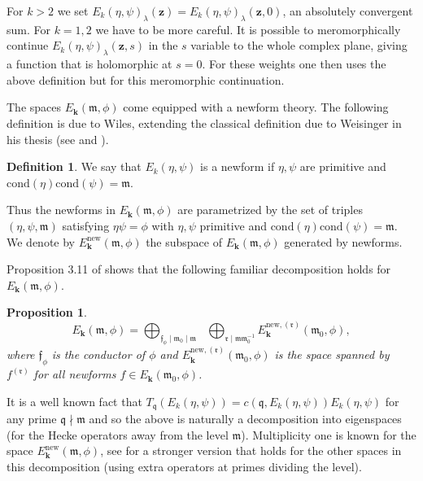 \documentclass[a4paper,oneside]{amsart}
\theoremstyle{plain}
\newtheorem{prop}[thm]{Proposition}
\theoremstyle{definition}
\newtheorem{define}[thm]{Definition}
\begin{document}
For $k>2$ we set $E_k(\eta,\psi)_{\lambda}(\textbf{z}) = E_k(\eta,\psi)_{\lambda}(\textbf{z},0)$, an absolutely convergent sum. For $k=1,2$ we have to be more careful. It is possible to meromorphically continue $E_k(\eta,\psi)_\lambda(\textbf{z},s)$ in the $s$ variable to the whole complex plane, giving a function that is holomorphic at $s=0$. For these weights one then uses the above definition but for this meromorphic continuation.

The spaces $E_{\textbf{k}}(\mathfrak{m},\phi)$ come equipped with a newform theory. The following definition is due to Wiles, extending the classical definition due to Weisinger in his thesis (see \cite{weisinger} and \cite{wiles}). 

\begin{define}
We say that $E_k(\eta,\psi)$ is a newform if $\eta, \psi$ are primitive and $\text{cond}(\eta)\text{cond}(\psi) = \mathfrak{m}$.
\end{define}

Thus the newforms in $E_{\textbf{k}}(\mathfrak{m},\phi)$ are parametrized by the set of triples $(\eta,\psi,\mathfrak{m})$ satisfying $\eta\psi = \phi$ with $\eta,\psi$ primitive and $\text{cond}(\eta)\text{cond}(\psi) = \mathfrak{m}$. We denote by $E^{\text{new}}_{\textbf{k}}(\mathfrak{m},\phi)$ the subspace of $E_{\textbf{k}}(\mathfrak{m},\phi)$ generated by newforms.

Proposition 3.11 of \cite{atwill} shows that the following familiar decomposition holds for $E_{\textbf{k}}(\mathfrak{m},\phi)$. 

\begin{prop}\[E_{\textbf{k}}(\mathfrak{m},\phi) = \bigoplus_{\mathfrak{f}_{\phi}\mid \mathfrak{m}_0\mid \mathfrak{m}} \,\,\,\,\bigoplus_{\mathfrak{r}\mid \mathfrak{m}\mathfrak{m}_0^{-1}} E_{\textbf{k}}^{\text{new},(\mathfrak{r})}(\mathfrak{m}_0,\phi),\] where $\mathfrak{f}_{\phi}$ is the conductor of $\phi$ and $E_{\textbf{k}}^{\text{new},(\mathfrak{r})}(\mathfrak{m}_0,\phi)$ is the space spanned by $f^{(\mathfrak{r})}$ for all newforms $f\in E_{\textbf{k}}(\mathfrak{m}_0,\phi)$.\end{prop}

It is a well known fact that $T_{\mathfrak{q}}(E_k(\eta,\psi)) = c(\mathfrak{q},E_k(\eta,\psi))E_k(\eta,\psi)$ for any prime $\mathfrak{q}\nmid \mathfrak{m}$ and so the above is naturally a decomposition into eigenspaces (for the Hecke operators away from the level $\mathfrak{m}$). Multiplicity one is known for the space $E_{\textbf{k}}^{\text{new}}(\mathfrak{m},\phi)$, see \cite{atwill} for a stronger version that holds for the other spaces in this decomposition (using extra operators at primes dividing the level).
\end{document}
